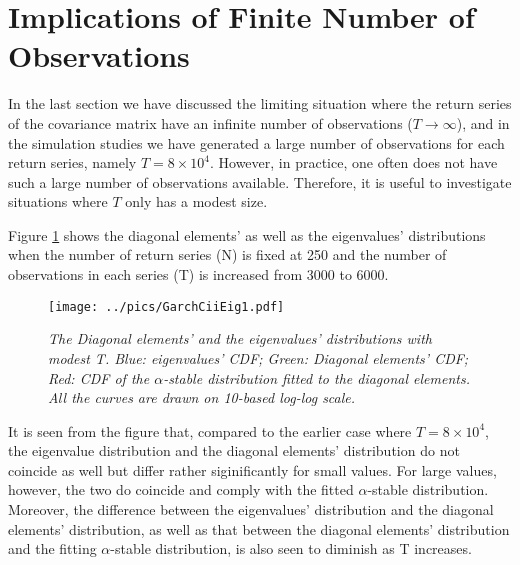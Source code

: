 
\section{Implications of Finite Number of Observations}
In the last section we have discussed the limiting situation where the
return series of the covariance matrix have an infinite number of
observations ($T \to \infty$), and in the simulation studies we have
generated a large number of observations for each return series,
namely $T = 8 \times 10^4$. However, in practice, one often does not
have such a large number of observations available. Therefore, it is
useful to investigate situations where $T$ only has a modest size.

Figure \ref{fig:GarchCiiEig1} shows the diagonal elements' as well as
the eigenvalues' distributions when the number of return series (N) is
fixed at 250 and the number of observations in each series (T) is
increased from 3000 to 6000.
\begin{figure}[htb!]
  \centering
    \texttt{[image: ../pics/GarchCiiEig1.pdf]}
  \caption{\small \it The Diagonal elements' and the eigenvalues'
    distributions with modest T. Blue: eigenvalues' CDF;
    Green: Diagonal elements' CDF; Red: CDF of the $\alpha$-stable
    distribution fitted to the diagonal elements. All the curves are
    drawn on 10-based log-log scale.
  }
  \label{fig:GarchCiiEig1}
\end{figure}
It is seen from the figure that, compared to the earlier case where $T
= 8 \times 10^4$, the eigenvalue distribution and the diagonal
elements' distribution do not coincide as well but differ rather
siginificantly for small values. For large values, however, the two do
coincide and comply with the fitted $\alpha$-stable
distribution. Moreover, the difference between the eigenvalues'
distribution and the diagonal elements' distribution, as well as that
between the diagonal elements' distribution and the fitting
$\alpha$-stable distribution, is also seen to diminish as T
increases.

